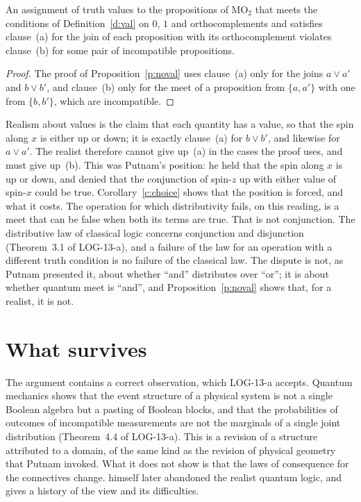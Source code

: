 \documentclass{situationist-preprint}
\begin{document}
\begin{corollary}\label{c:choice}
An assignment of truth values to the propositions of $\mathrm{MO}_2$ that meets the conditions of Definition~\ref{d:val} on $0$, $1$ and orthocomplements and satisfies clause~(a) for the join of each proposition with its orthocomplement violates clause~(b) for some pair of incompatible propositions.
\end{corollary}

\begin{proof}
The proof of Proposition~\ref{p:noval} uses clause~(a) only for the joins $a \vee a'$ and $b \vee b'$, and clause~(b) only for the meet of a proposition from $\{a, a'\}$ with one from $\{b, b'\}$, which are incompatible.
\end{proof}

Realism about values is the claim that each quantity has a value, so that the spin along $x$ is either up or down; it is exactly clause~(a) for $b \vee b'$, and likewise for $a \vee a'$. The realist therefore cannot give up~(a) in the cases the proof uses, and must give up~(b). This was Putnam's position: he held that the spin along $x$ is up or down, and denied that the conjunction of spin-$z$ up with either value of spin-$x$ could be true. Corollary~\ref{c:choice} shows that the position is forced, and what it costs. The operation for which distributivity fails, on this reading, is a meet that can be false when both its terms are true. That is not conjunction. The distributive law of classical logic concerns conjunction and disjunction (Theorem~3.1 of LOG-13-a), and a failure of the law for an operation with a different truth condition is no failure of the classical law. The dispute is not, as Putnam presented it, about whether \enquote{and} distributes over \enquote{or}; it is about whether quantum meet is \enquote{and}, and Proposition~\ref{p:noval} shows that, for a realist, it is not.

\section{What survives}

The argument contains a correct observation, which LOG-13-a accepts. Quantum mechanics shows that the event structure of a physical system is not a single Boolean algebra but a pasting of Boolean blocks, and that the probabilities of outcomes of incompatible measurements are not the marginals of a single joint distribution (Theorem~4.4 of LOG-13-a). This is a revision of a structure attributed to a domain, of the same kind as the revision of physical geometry that Putnam invoked. What it does not show is that the laws of consequence for the connectives change. \citet{Putnam2005} himself later abandoned the realist quantum logic, and \citet{Maudlin2005} gives a history of the view and its difficulties.
\end{document}
